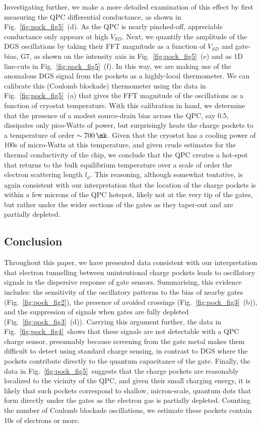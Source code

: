 Investigating further, we make a more detailed examination of this effect by first measuring the QPC differential conductance, as shown in Fig.~\ref{fig:pock_fig5}~(d). As the QPC is nearly pinched-off, appreciable conductance only appears at high $V_{SD}$. Next, we quantify the amplitude of the DGS oscillations by taking their FFT magnitude as a function of $V_{SD}$ and gate-bias, G7, as shown on the intensity axis in Fig.~\ref{fig:pock_fig5}~(e) and as 1D line-cuts in Fig.~\ref{fig:pock_fig5}~(f). In this way, we are making use of the anomalous DGS signal from the pockets as a highly-local thermometer. We can calibrate this (Coulomb blockade) thermometer using the data in Fig.~\ref{fig:pock_fig5}~(a) that gives the FFT magnitude of the oscillations as a function of cryostat temperature. With this calibration in hand, we determine that the presence of a modest source-drain bias across the QPC, say \SI{0.5}{\mv}, dissipates only pico-Watts of power, but surprisingly heats the charge pockets to a temperature of order $\sim \SI{700}{\mk}$. Given that the cryostat has a cooling power of 100s of micro-Watts at this temperature, and given crude estimates for the thermal conductivity of the chip, we conclude that the QPC creates a hot-spot that returns to the bulk equilibrium temperature over a scale of order the electron scattering length $l_\phi$. This reasoning, although somewhat tentative, is again consistent with our interpretation that the location of the charge pockets is within a  few microns of the QPC hotspot, likely not at the very tip of the gates, but rather under the wider sections of the gates as they taper-out and are partially depleted.

\subsection{Conclusion}
Throughout this paper, we have presented data consistent with our interpretation that electron tunnelling between unintentional charge pockets leads to oscillatory signals in the dispersive response of gate sensors. Summarising, this evidence includes: the sensitivity of the oscillatory patterns to the bias of nearby gates (Fig.~\ref{fig:pock_fig2}), the presence of avoided crossings (Fig.~\ref{fig:pock_fig3}~(b)), and the suppression of signals when gates are fully depleted (Fig.~\ref{fig:pock_fig3}~(d)). Carrying this argument further, the data in Fig.~\ref{fig:pock_fig4}~shows that these signals are not detectable with a QPC charge sensor, presumably because screening from the gate metal makes them difficult to detect using standard charge sensing, in contrast to DGS where the pockets contribute directly to the quantum capacitance of the gate. Finally,  the data in Fig.~\ref{fig:pock_fig5}~suggests that the charge pockets are reasonably localized to the vicinity of the QPC, and given their small charging energy, it is likely that such pockets correspond to shallow, micron-scale, quantum dots that form directly under the gates as the electron gas is partially depleted. Counting the number of Coulomb blockade oscillations, we estimate these pockets contain 10s of electrons or more.

